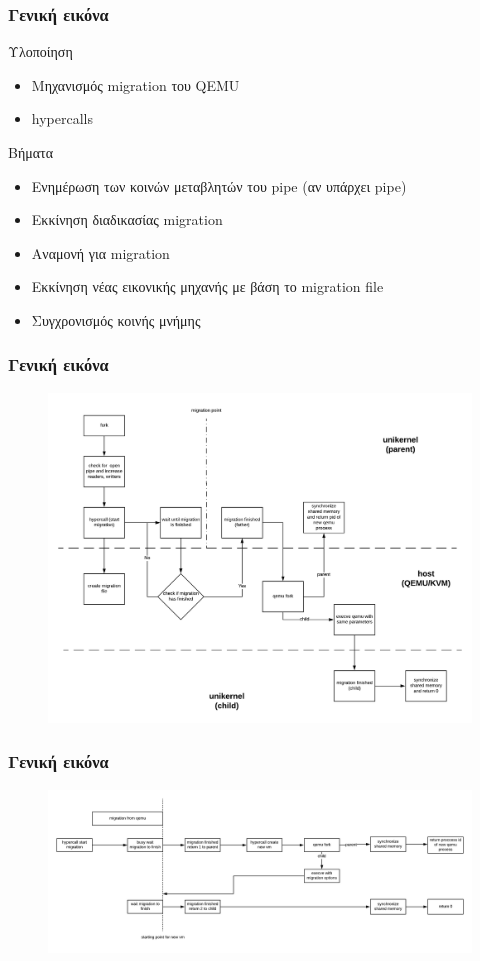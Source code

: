 \documentclass[red,slidestop,notes,compress,mathserif]{beamer}
\begin{document}
\begin{frame}
\frametitle{Γενική εικόνα}
\begin{block}{Υλοποίηση}
\begin{itemize}
\item Μηχανισμός migration του QEMU
\item hypercalls 
\end{itemize}
\end{block}
\begin{block}{Βήματα}
\begin{itemize}
\item Ενημέρωση των κοινών μεταβλητών του pipe (αν υπάρχει pipe)
\item Εκκίνηση διαδικασίας migration
\item Αναμονή για migration
\item Εκκίνηση νέας εικονικής μηχανής με βάση το migration file
\item Συγχρονισμός κοινής μνήμης
\end{itemize}
\end{block}
\end{frame}

\begin{frame}
\frametitle{Γενική εικόνα}
\begin{figure}
\center
\includegraphics[scale=0.4]{figures/fork_olo.png}
\end{figure}
\end{frame}

\begin{frame}
\frametitle{Γενική εικόνα}
\begin{figure}
\center
\includegraphics[scale=0.4]{figures/fork_timeline.png}
\end{figure}
\end{frame}
\end{document}
